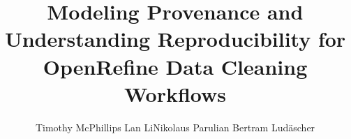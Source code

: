 \documentclass[sigconf,screen,nonacm]{acmart}
\begin{document}
\title[Reproducible Data Cleaning]{Modeling Provenance and Understanding Reproducibility for OpenRefine Data
  Cleaning Workflows}

\author{Timothy McPhillips \qquad Lan Li\qquad Nikolaus Parulian
  \qquad Bertram Lud\"ascher}
 


\maketitle













%
%


\end{document}
